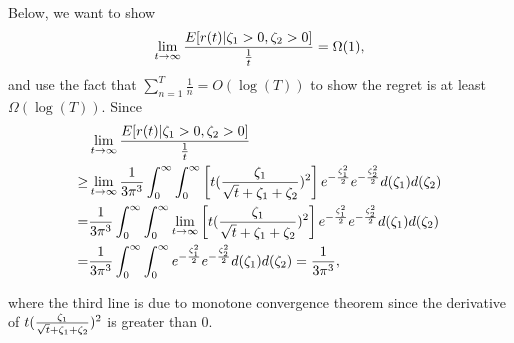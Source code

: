Below, we want to show 
\begin{align}
\lim_{t\rightarrow\infty}\frac{E[r(t)| \Noise{1}>0, \Noise{2}>0]}{\frac{1}{t}} = \Omega(1), \nonumber
\end{align}
and use the fact that $\sum_{n=1}^{T}\frac{1}{n}=O(\log(T))$ to show the regret is at least $\Omega(\log(T))$. Since
\begin{align}
&\lim_{t\rightarrow \infty}\frac{E[r(t)| \Noise{1}>0, \Noise{2}>0]}{\frac{1}{t}} \nonumber \\
\geq & \lim_{t\rightarrow \infty}\frac{1}{3\pi^3}\int_{0}^{\infty} \int_{0}^{\infty}\left[ t(\frac{\Noise{1}}{\sqrt{t}+\Noise{1}+\Noise{2}})^2\right]e^{-\frac{\Noise{1}^2}{2}}e^{-\frac{\Noise{2}^2}{2}}d(\Noise{1})d(\Noise{2}) \nonumber  \\
= & \frac{1}{3\pi^3}\int_{0}^{\infty} \int_{0}^{\infty}\lim_{t\rightarrow \infty}\left[ t(\frac{\Noise{1}}{\sqrt{t}+\Noise{1}+\Noise{2}})^2\right]e^{-\frac{\Noise{1}^2}{2}}e^{-\frac{\Noise{2}^2}{2}}d(\Noise{1})d(\Noise{2}) \nonumber  \\
=&\frac{1}{3\pi^3}\int_{0}^{\infty} \int_{0}^{\infty}e^{-\frac{\Noise{1}^2}{2}}e^{-\frac{\Noise{2}^2}{2}}d(\Noise{1})d(\Noise{2}) = \frac{1}{3\pi^3}, \nonumber
\end{align}

where the third line is due to monotone convergence theorem since the derivative of $t(\frac{\Noise{1}}{\sqrt{t}+\Noise{1}+\Noise{2}})^2$ is greater than $0$.



 
